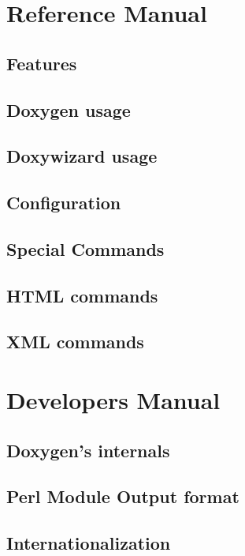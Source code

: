 \documentclass{book}
\newcommand{\+}{\discretionary{\mbox{\scriptsize$\hookleftarrow$}}{}{}}
\begin{document}
\part{Reference Manual}
\chapter{Features}\label{features}\hypertarget{features}{}
\chapter{Doxygen usage}\label{doxygen_usage}\hypertarget{doxygen_usage}{}
\chapter{Doxywizard usage}\label{doxywizard_usage}\hypertarget{doxywizard_usage}{}
\chapter{Configuration}\label{config}\hypertarget{config}{}
\chapter{Special Commands}\label{commands}\hypertarget{commands}{}
\chapter{HTML commands}\label{htmlcmds}\hypertarget{htmlcmds}{}
\chapter{XML commands}\label{xmlcmds}\hypertarget{xmlcmds}{}
\part{Developers Manual}
\chapter{Doxygen's internals}\label{arch}\hypertarget{arch}{}
\chapter{Perl Module Output format}\label{perlmod}\hypertarget{perlmod}{}
\chapter{Internationalization}\label{langhowto}\hypertarget{langhowto}{}
\renewcommand{\thepart}{}
\end{document}

